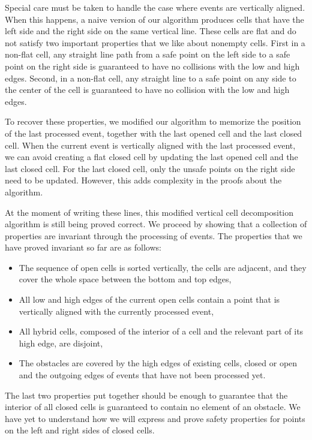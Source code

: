 \documentclass{easychair}
\begin{document}
Special care must be taken to handle the case where events are
vertically aligned.  When this happens, a naive version of our
algorithm produces cells that have the left side and the right side on the
same vertical line.  These cells are flat and do not satisfy two important
properties that we like about nonempty cells.  First in a non-flat cell,
any straight line path from a safe point on the left side to a safe point on
the right side is guaranteed to have no collisions with the low and high
edges.  Second, in a non-flat cell, any straight line to a safe
point on any side to the center of the cell is guaranteed to have no
collision with the low and high edges.

To recover these properties, we modified our algorithm to memorize the
position of the last processed event, together with the last opened
cell and the last closed cell.  When the current event is vertically
aligned with the last processed event, we can avoid creating a flat
closed cell by updating the last opened cell and the last closed
cell.  For the last closed cell, only the unsafe points on the right side
need to be updated.  However, this adds complexity in the proofs about the
algorithm.

At the moment of writing these lines, this modified vertical cell
decomposition algorithm is still being proved correct.  We proceed by
showing that a collection of properties are invariant through the
processing of events.  The properties that we have proved invariant so
far are as follows:
\begin{itemize}
\item The sequence of open cells is sorted vertically, the cells are
  adjacent, and they cover the whole space between the bottom and top
  edges,
\item All low and high edges of the current open cells contain a point
that is vertically aligned with the currently processed event,
\item All hybrid cells, composed of the interior of a cell and the relevant
part of its high edge, are disjoint,
\item The obstacles are covered by the high edges of existing cells,
  closed or open and the outgoing edges of events that have not been
  processed yet.
\end{itemize}
The last two properties put together should be enough to guarantee
that the interior of all closed cells is guaranteed to contain no
element of an obstacle.  We have yet to
understand how we will express and prove safety properties for points
on the left and right sides of closed cells.
\end{document}
